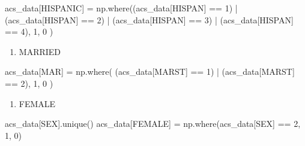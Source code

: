 \documentclass[
  11pt,
  letterpaper,
  DIV=11,
  numbers=noendperiod]{scrartcl}
\newenvironment{Shaded}{\begin{snugshade}}{\end{snugshade}}
\newcommand{\DecValTok}[1]{\textcolor[rgb]{0.68,0.00,0.00}{#1}}
\newcommand{\NormalTok}[1]{\textcolor[rgb]{0.00,0.23,0.31}{#1}}
\newcommand{\OperatorTok}[1]{\textcolor[rgb]{0.37,0.37,0.37}{#1}}
\newcommand{\StringTok}[1]{\textcolor[rgb]{0.13,0.47,0.30}{#1}}
\providecommand{\tightlist}{%
  \setlength{\itemsep}{0pt}\setlength{\parskip}{0pt}}\usepackage{longtable,booktabs,array}
\begin{document}
\begin{Shaded}
\begin{Highlighting}[]
\NormalTok{acs\_data[}\StringTok{\textquotesingle{}HISPANIC\textquotesingle{}}\NormalTok{] }\OperatorTok{=}\NormalTok{ np.where((acs\_data[}\StringTok{\textquotesingle{}HISPAN\textquotesingle{}}\NormalTok{] }\OperatorTok{==} \DecValTok{1}\NormalTok{) }\OperatorTok{|}\NormalTok{ (acs\_data[}\StringTok{\textquotesingle{}HISPAN\textquotesingle{}}\NormalTok{] }\OperatorTok{==} \DecValTok{2}\NormalTok{) }\OperatorTok{|}\NormalTok{ (acs\_data[}\StringTok{\textquotesingle{}HISPAN\textquotesingle{}}\NormalTok{] }\OperatorTok{==} \DecValTok{3}\NormalTok{) }\OperatorTok{|}\NormalTok{ (acs\_data[}\StringTok{\textquotesingle{}HISPAN\textquotesingle{}}\NormalTok{] }\OperatorTok{==} \DecValTok{4}\NormalTok{),}
    \DecValTok{1}\NormalTok{,}
    \DecValTok{0}
\NormalTok{)}
\end{Highlighting}
\end{Shaded}

\begin{enumerate}
\def\labelenumi{\roman{enumi}.}
\setcounter{enumi}{5}
\tightlist
\item
  MARRIED
\end{enumerate}

\begin{Shaded}
\begin{Highlighting}[]
\NormalTok{acs\_data[}\StringTok{\textquotesingle{}MAR\textquotesingle{}}\NormalTok{] }\OperatorTok{=}\NormalTok{ np.where(}
\NormalTok{    (acs\_data[}\StringTok{\textquotesingle{}MARST\textquotesingle{}}\NormalTok{] }\OperatorTok{==} \DecValTok{1}\NormalTok{) }\OperatorTok{|}\NormalTok{ (acs\_data[}\StringTok{\textquotesingle{}MARST\textquotesingle{}}\NormalTok{] }\OperatorTok{==} \DecValTok{2}\NormalTok{),}
    \DecValTok{1}\NormalTok{,}
    \DecValTok{0}
\NormalTok{)}
\end{Highlighting}
\end{Shaded}

\begin{enumerate}
\def\labelenumi{\roman{enumi}.}
\setcounter{enumi}{6}
\tightlist
\item
  FEMALE
\end{enumerate}

\begin{Shaded}
\begin{Highlighting}[]
\NormalTok{acs\_data[}\StringTok{\textquotesingle{}SEX\textquotesingle{}}\NormalTok{].unique()}
\NormalTok{acs\_data[}\StringTok{\textquotesingle{}FEMALE\textquotesingle{}}\NormalTok{] }\OperatorTok{=}\NormalTok{ np.where(acs\_data[}\StringTok{\textquotesingle{}SEX\textquotesingle{}}\NormalTok{] }\OperatorTok{==} \DecValTok{2}\NormalTok{, }\DecValTok{1}\NormalTok{, }\DecValTok{0}\NormalTok{)}
\end{Highlighting}
\end{Shaded}
\end{document}
